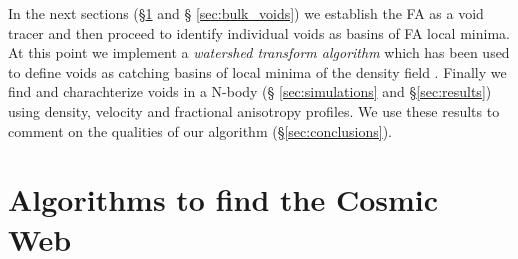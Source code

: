 \documentclass[a4,useAMS,usenatbib,usegraphicx]{mn2e}
\providecommand{\DIFaddbegin}{} %
\providecommand{\DIFaddend}{} %
\begin{document}
\DIFaddbegin 

\DIFaddend In the next sections (\S \ref{sec:algorithms_cosmic_web} and \S
\ref{sec:bulk_voids}) we establish the FA as a void tracer and then
proceed to identify individual voids as basins of FA local minima.  At
this point we implement a \textit{watershed transform algorithm}
\citep{Beucher79,Beucher93} which has been used to define voids as
catching basins of local minima of the density field \citep{Platen07,Neyrinck08}.
Finally we find and charachterize voids in a N-body (\S
\ref{sec:simulations} and \S \ref{sec:results}) using density, velocity and
fractional anisotropy profiles.  We use these results to comment on
the qualities of our algorithm (\S \ref{sec:conclusions}).  



\section{Algorithms to find the Cosmic Web}
\label{sec:algorithms_cosmic_web}
\end{document}

